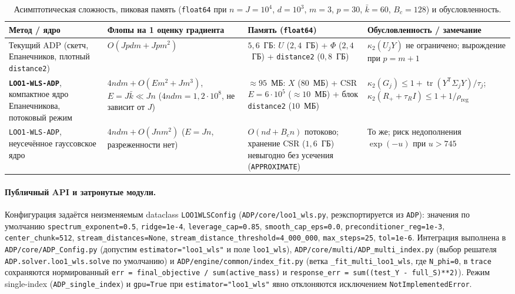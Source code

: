 \documentclass[11pt,a4paper]{article}
\numberwithin{equation}{section}
\theoremstyle{definition}
\theoremstyle{remark}
\newcommand{\tr}{\operatorname{tr}}
\newcommand{\T}{^{\mathsf T}}
\newcommand{\code}[1]{\nolinkurl{#1}}
\begin{document}
\begin{table}[htbp]
\centering
\caption{Асимптотическая сложность, пиковая память (\texttt{float64} при $n=J=10^4$, $d=10^3$, $m=3$, $p=30$, $\bar{k}=60$, $B_c=128$) и обусловленность.}
\label{tab:complexity}
\footnotesize
\begin{tabularx}{\textwidth}{@{}L{3.1cm}YYY@{}}
\toprule
Метод / ядро & Флопы на 1 оценку градиента & Память (\texttt{float64}) & Обусловленность / замечание \\
\midrule
Текущий ADP (скетч, Епанечников, плотный \code{distance2}) & $O(J p d m + J p m^2)$ & $5{,}6$~ГБ: $U$ ($2{,}4$~ГБ) + $\Phi$ ($2{,}4$~ГБ) + \code{distance2} ($0{,}8$~ГБ) & $\kappa_2(U_j Y)$ не ограничено; вырождение при $p = m+1$ \\
\textbf{\texttt{LOO1-WLS-ADP}}, компактное ядро Епанечникова, потоковый режим & $4ndm + O(E m^2 + J m^3)$, $E = J\bar{k} \ll Jn$ ($4ndm = 1{,}2\cdot 10^8$, не зависит от $J$) & $\approx 95$~МБ: $X$ ($80$~МБ) + CSR $E=6\cdot 10^5$ ($\approx 10$~МБ) + блок \code{distance2} ($10$~МБ) & $\kappa_2(G_j) \le 1 + \tr(Y\T\Sigma_j Y)/\tau_j$; $\kappa_2(R_+ + \tau_R I) \le 1 + 1/\rho_{\mathrm{reg}}$ \\
\texttt{LOO1-WLS-ADP}, неусечённое гауссовское ядро & $4ndm + O(J n m^2)$ ($E = Jn$, разреженности нет) & $O(nd + B_c n)$ потоково; хранение CSR ($1{,}6$~ГБ) невыгодно без усечения (\texttt{APPROXIMATE}) & То же; риск недополнения $\exp(-u)$ при $u > 745$ \\
\bottomrule
\end{tabularx}
\end{table}

\paragraph{Публичный API и затронутые модули.}
Конфигурация задаётся неизменяемым dataclass \code{LOO1WLSConfig} (\code{ADP/core/loo1_wls.py},
реэкспортируется из \code{ADP}): значения по умолчанию \code{spectrum_exponent=0.5},
\code{ridge=1e-4}, \code{leverage_cap=0.85}, \code{smooth_cap_eps=0.0},
\code{preconditioner_reg=1e-3}, \code{center_chunk=512}, \code{stream_distances=None},
\code{stream_distance_threshold=4_000_000}, \code{max_steps=25}, \code{tol=1e-6}.
Интеграция выполнена в \code{ADP/core/ADP_Config.py} (допустим \code{estimator="loo1_wls"} и поле \code{loo1_wls}),
\code{ADP/core/multi/ADP_multi_index.py} (выбор решателя \code{ADP.solver.loo1_wls.solve} по умолчанию)
и \code{ADP/engine/common/index_fit.py} (ветка \code{_fit_multi_loo1_wls}, где \code{N_phi=0},
в \code{trace} сохраняются нормированный \code{err = final_objective / sum(active_mass)} и
\code{response_err = sum((test_Y - full_S)**2)}).
Режим single-index (\code{ADP_single_index}) и \code{gpu=True} при \code{estimator="loo1_wls"}
явно отклоняются исключением \code{NotImplementedError}.
\end{document}
